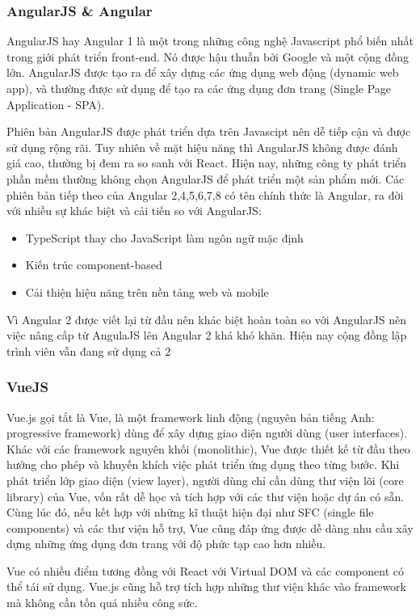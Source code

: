 \subsubsection{AngularJS \& Angular}
AngularJS hay Angular 1 là một trong những công nghệ Javascript phổ biến nhất trong giới phát triển front-end. Nó được hậu thuẫn bởi Google và một cộng đồng lớn. AngularJS được tạo ra để xây dựng các ứng dụng web động (dynamic web app), và thường được sử dụng để tạo ra các ứng dụng đơn trang (Single Page Application - SPA).

Phiên bản AngularJS được phát triển dựa trên Javascipt nên dễ tiếp cận và được sử dụng rộng rãi. Tuy nhiên về mặt hiệu năng thì AngularJS không được đánh giá cao, thường bị đem ra so sanh với React. Hiện nay, những công ty phát triển phần mềm thường không chọn AngularJS để phát triển một sản phẩm mới.
Các phiên bản tiếp theo của Angular 2,4,5,6,7,8 có tên chính thức là Angular, ra đời với nhiều sự khác biệt và cải tiến so với AngularJS:
\begin {itemize}
\item TypeScript thay cho JavaScript làm ngôn ngữ mặc định
\item Kiến trúc component-based
\item Cải thiện hiệu năng trên nền tảng web và mobile
\end {itemize}
Vì Angular 2 được viết lại từ đầu nên khác biệt hoàn toàn so với AngularJS nên việc nâng cấp từ AngulaJS lên Angular 2 khá khó khăn. Hiện nay cộng đồng lập trình viên vẫn đang sử dụng cả 2 

\subsubsection{VueJS}
Vue.js gọi tắt là Vue, là một framework linh động (nguyên bản tiếng Anh: progressive framework) dùng để xây dựng giao diện người dùng (user interfaces). Khác với các framework nguyên khối (monolithic), Vue được thiết kế từ đầu theo hướng cho phép và khuyến khích việc phát triển ứng dụng theo từng bước. Khi phát triển lớp giao diện (view layer), người dùng chỉ cần dùng thư viện lõi (core library) của Vue, vốn rất dễ học và tích hợp với các thư viện hoặc dự án có sẵn. Cùng lúc đó, nếu kết hợp với những kĩ thuật hiện đại như SFC (single file components) và các thư viện hỗ trợ, Vue cũng đáp ứng được dễ dàng nhu cầu xây dựng những ứng dụng đơn trang với độ phức tạp cao hơn nhiều.

Vue có nhiều điểm tương đồng với React với Virtual DOM và các component có thể tái sử dụng. Vue.js cũng hỗ trợ tích hợp những thư viện khác vào framework mà không cần tốn quá nhiều công sức.
